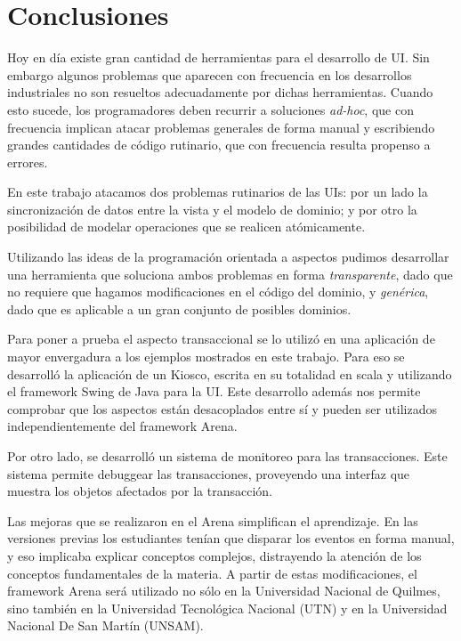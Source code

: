 \section{Conclusiones}
\label{Conclusions}
Hoy en día existe gran cantidad de herramientas para el
desarrollo de UI. Sin embargo algunos problemas que
aparecen con frecuencia en los desarrollos industriales no son resueltos
adecuadamente por dichas herramientas.
 Cuando esto sucede, los programadores deben recurrir a soluciones
\emph{ad-hoc},  que con frecuencia implican atacar problemas generales de forma
manual y escribiendo grandes cantidades de código rutinario, que con
frecuencia resulta propenso a errores.

En este trabajo atacamos dos problemas rutinarios de las UIs:
por un lado la sincronización de datos entre la vista y el modelo de dominio; y
por otro la posibilidad de modelar operaciones que se realicen atómicamente.

Utilizando las ideas de la programación orientada a aspectos pudimos desarrollar
una herramienta que soluciona ambos problemas en forma \emph{transparente}, dado
que no requiere que hagamos modificaciones en el código del dominio, y \emph{genérica},
dado que es aplicable a un gran conjunto de posibles dominios.

\medskip

Para poner a prueba el aspecto transaccional se lo utilizó en una aplicación de
mayor envergadura a los ejemplos mostrados en este trabajo.
Para eso se desarrolló la aplicación de un Kiosco, escrita en su totalidad en
scala y utilizando el framework Swing de Java para la UI.
Este desarrollo además nos permite comprobar que los aspectos están desacoplados
entre sí y pueden ser utilizados independientemente del framework Arena.


Por otro lado, se desarrolló un sistema de monitoreo para las transacciones.
Este sistema permite debuggear las transacciones, proveyendo una interfaz que muestra los
objetos afectados por la transacción.


Las mejoras que se realizaron en el Arena simplifican el aprendizaje.
En las versiones previas los estudiantes tenían que disparar los eventos en forma
manual, y eso implicaba explicar conceptos complejos, distrayendo la atención de
los conceptos fundamentales de la materia.
A partir de estas modificaciones, el framework Arena será utilizado no
sólo en la Universidad Nacional de Quilmes, sino también en la Universidad
Tecnológica Nacional (UTN) y en la Universidad Nacional De San Martín (UNSAM).
